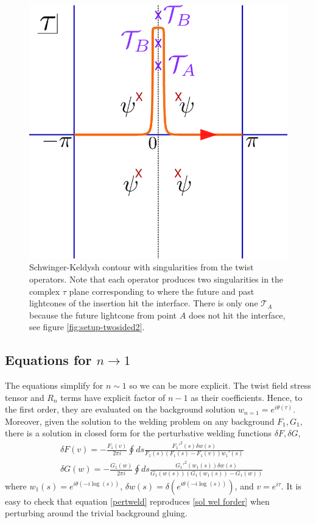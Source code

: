 \documentclass[12pt]{article}
\newcommand{\p}{\partial}
\newcommand{\f}{\frac}
\let\l=\lambda \let\m=\mu \let\n=\nu \let\x=\xi \let\p=\phi \let\r=v
\let\f=\frac
\renewcommand{\p}{\partial}
\numberwithin{equation}{section}
\def\m{{\mu}}
\def\n{{\nu}}
\def\p{{\phi}}
\def\r{\rightarrow}
\def\f {\frac}
\def\l{\left}
\def\r{\right}
\def\x{\bar{x}}
\renewcommand{\p}{\partial}
\begin{document}
\begin{spacing}{1.1}
\begin{figure}
\begin{center}
\includegraphics[scale=0.6]{figures/skcontour_replicasvg.pdf}
\end{center}
\caption{Schwinger-Keldysh contour with singularities from the twist operators. Note that each operator produces two singularities in the complex $\tau$ plane corresponding to where the future and past lightcones of the insertion hit the interface. There is only one $\mathcal{T}_A$ because the future lightcone from point $A$ does not hit the interface, see figure \ref{fig:setup-twosided2}.\label{fig:SKtwist} 
}
\end{figure}


\subsection{Equations for $n\to1$}

The equations simplify for $n\sim1$ so we can be more explicit. The twist field stress tensor and $R_n$ terms have explicit factor of $n-1$ as their coefficients. Hence, to the first order, they are evaluated on the background solution $w_{n=1} =e^{ i \theta(\tau)}$. 
Moreover, given the solution to the welding problem on any background $F_1, G_1$, there is a solution in closed form for the perturbative welding functions\cite{KIRILLOV1998735} $\delta F , \delta G$,
\begin{align}\label{pertweld}
&\delta F(v)= -\f{F_1(v)}{2\pi i} \oint ds \f{F_1'^2(s) \delta w(s)}{F_1(s) (F_1(s)- F_1(v)) w_1'(s) } \nonumber\\
&\delta G(w)= -\f{G_1(w)}{2\pi i} \oint ds \f{G_1'^2(w_1(s)) \delta w(s)}{ G_1(w(s)) \l(G_1(w_1(s))- G_1(w)\r) }
\end{align}
where $w_1 (s) = e^{i \theta(-i \log(s))}$, $\delta w(s) = \delta \l( e^{i \theta(-i \log(s))} \r)$, and  $v=e^{ i \tau}$.  It is easy to check that equation \eqref{pertweld} reproduces \eqref{sol wel forder} when perturbing around the trivial background gluing. 


\end{spacing}
\end{document}
